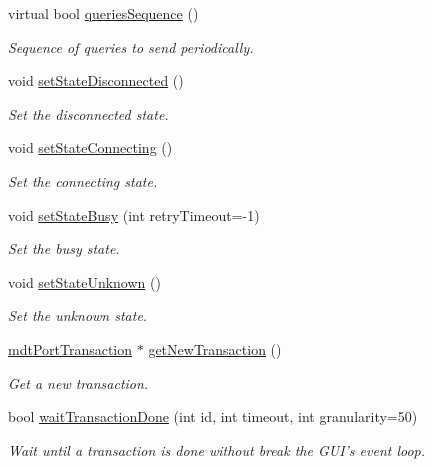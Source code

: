 \begin{DoxyCompactItemize}
virtual bool \hyperlink{classmdt_device_acba50968d201ad95c4eaa2ab2ed48b4f}{queriesSequence} ()
\begin{DoxyCompactList}\small\item\em Sequence of queries to send periodically. \end{DoxyCompactList}\item 
void \hyperlink{classmdt_device_ac3df06706c79730fde70ee6131af577c}{setStateDisconnected} ()
\begin{DoxyCompactList}\small\item\em Set the disconnected state. \end{DoxyCompactList}\item 
void \hyperlink{classmdt_device_afe240d2bb42c13182ea3b1b5deff006b}{setStateConnecting} ()
\begin{DoxyCompactList}\small\item\em Set the connecting state. \end{DoxyCompactList}\item 
void \hyperlink{classmdt_device_abf01ab213b91df9ff03ad6b7184abf88}{setStateBusy} (int retryTimeout=-\/1)
\begin{DoxyCompactList}\small\item\em Set the busy state. \end{DoxyCompactList}\item 
void \hyperlink{classmdt_device_a312bf413dfc16765328843f3fe08a4b8}{setStateUnknown} ()
\begin{DoxyCompactList}\small\item\em Set the unknown state. \end{DoxyCompactList}\item 
\hyperlink{classmdt_port_transaction}{mdtPortTransaction} $\ast$ \hyperlink{classmdt_device_a0e57cc8b749581cff447d514b9a1ff8e}{getNewTransaction} ()
\begin{DoxyCompactList}\small\item\em Get a new transaction. \end{DoxyCompactList}\item 
bool \hyperlink{classmdt_device_a1df875803a3a0eb7324047d33c139621}{waitTransactionDone} (int id, int timeout, int granularity=50)
\begin{DoxyCompactList}\small\item\em Wait until a transaction is done without break the GUI's event loop. \end{DoxyCompactList}\end{DoxyCompactItemize}
